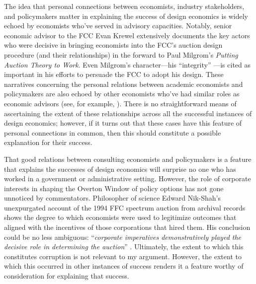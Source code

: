 The idea that personal connections between economists, industry stakeholders, and policymakers matter in explaining the success of design economics is widely echoed by economists who've served in advisory capacities. Notably, senior economic advisor to the FCC Evan Krewel extensively documents the key actors who were decisive in bringing economists into the FCC's auction design procedure (and their relationships) in the forward to Paul Milgrom's \autocite*{milgrom2004} \textit{Putting Auction Theory to Work}. Even Milgrom's character---his ``integrity'' \autocite[xix]{milgrom2004}---is cited as important in his efforts to persuade the FCC to adopt his design. These narratives concerning the personal relations between academic economists and policymakers are also echoed by other economists who've had similar roles as economic advisors (see, for example, \cite{roth2002, sönmez2023minimalist}). There is no straightforward means of ascertaining the extent of these relationships across all the successful instances of design economics; however, if it turns out that these cases have this feature of personal connections in common, then this should constitute a possible explanation for their success.

That good relations between consulting economists and policymakers is a feature that explains the successes of design economics will surprise no one who has worked in a government or administrative setting. However, the role of corporate interests in shaping the Overton Window of policy options has not gone unnoticed by commentators. Philosopher of science Edward Nik-Shah's unexpurgated account \autocite*{nikkhah2008} of the 1994 FFC spectrum auction from archival records shows the degree to which economists were used to legitimize outcomes that aligned with the incentives of those corporations that hired them. His conclusion could be no less ambiguous: ``\textit{corporate imperatives demonstratively played the decisive role in determining the auction}'' \autocite[89, emphasis original]{nikkhah2008}. Ultimately, the extent to which this constitutes corruption is not relevant to my argument. However, the extent to which this occurred in other instances of success renders it a feature worthy of consideration for explaining that success.

